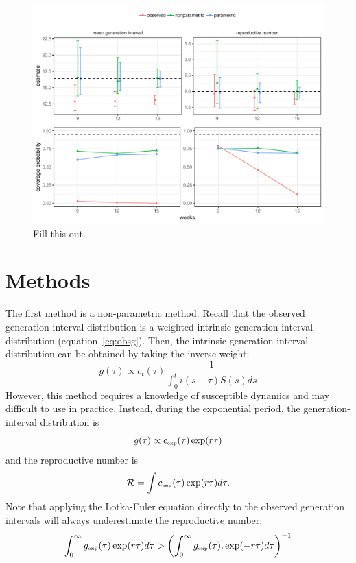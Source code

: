 \documentclass[12pt]{article}
\newcommand{\RR}{\ensuremath{{\mathcal R}}}
\newcommand{\tsub}[2]{#1_{{\textrm{\tiny #2}}}}
\begin{document}
\begin{figure}
\includegraphics[width=\textwidth]{../fig/compare_methods.pdf}
\caption{Fill this out.}
\label{fig:test}
\end{figure}



\section{Methods}

The first method is a non-parametric method.
Recall that the observed generation-interval distribution is a weighted intrinsic generation-interval distribution (equation~\ref{eq:obsg}). 
Then, the intrinsic generation-interval distribution can be obtained by taking the inverse weight:
\begin{equation}
g(\tau) \propto c_t(\tau) \frac{1}{\int_{0}^t i(s-\tau) S(s) ds}
\end{equation}
However, this method requires a knowledge of susceptible dynamics and may difficult to use in practice.
Instead, during the exponential period, the generation-interval distribution is
\begin{equation}
g(\tau) \propto \tsub{c}{exp}(\tau) \exp(r\tau)
\end{equation}
and the reproductive number is
\begin{equation}
\RR = \int \tsub{c}{exp}(\tau) \exp(r\tau) d\tau.
\end{equation}
Note that applying the Lotka-Euler equation directly to the observed generation intervals will always underestimate the reproductive number:
\begin{equation}
\int_0^\infty \tsub{g}{exp}(\tau) \exp(r\tau) d\tau > \left(\int_0^\infty \tsub{g}{exp}(\tau). \exp(-r\tau) d\tau\right)^{-1}
\end{equation}
\end{document}
